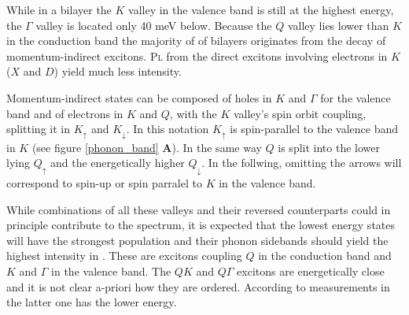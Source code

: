 While in a bilayer the $K$ valley in the valence band is still at the highest energy, the $\Gamma$ valley is located only 40 meV below\cite{wilson_determination_2017}. Because the $Q$ valley lies lower than $K$ in the conduction band the majority of \pl of \wse bilayers originates from the decay of momentum-indirect excitons. \textsc{Pl} from the direct excitons involving electrons in $K$ ($X$ and $D$) yield much less intensity.

Momentum-indirect states can be composed of holes in $K$ and $\Gamma$ for the valence band and of electrons in $K$ and $Q$, with the $K$ valley's spin orbit coupling, splitting it in $K_\uparrow$ and $K_\downarrow$. In this notation $K_\uparrow$ is spin-parallel to the valence band in $K$ (see figure \ref{phonon_band} \textbf{A}). In the same way $Q$ is split into the lower lying $Q_\uparrow$ and the energetically higher $Q_\downarrow$. In the follwing, omitting the arrows will correspond to spin-up or spin parralel to $K$ in the valence band.

While combinations of all these valleys and their reversed counterparts could in principle contribute to the \pl spectrum, it is expected that the lowest energy states will have the strongest population and their phonon sidebands should yield the highest intensity in \pl\!. These are excitons coupling $Q$ in the conduction band and $K$ and $\Gamma$ in the valence band. The $QK$ and $Q\Gamma$ excitons are energetically close and it is not clear a-priori how they are ordered. According to measurements in \cite{lindlau_role_2017} the latter one has the lower energy. 
